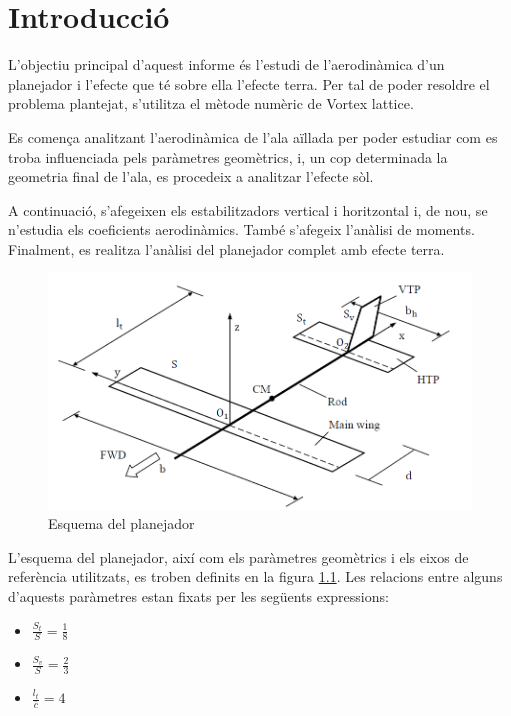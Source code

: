 \chapter{Introducció}

L'objectiu principal d'aquest informe és l'estudi de l'aerodinàmica d'un planejador i l'efecte que té sobre ella l'efecte terra. Per tal de poder resoldre el problema plantejat, s'utilitza el mètode numèric de Vortex lattice.

Es comença analitzant l'aerodinàmica de l'ala aïllada per poder estudiar com es troba influenciada pels paràmetres geomètrics, i, un cop determinada la geometria final de l'ala, es procedeix a analitzar l'efecte sòl.

A continuació, s'afegeixen els estabilitzadors vertical i horitzontal i, de nou, se n'estudia els coeficients aerodinàmics. També s'afegeix l'anàlisi de moments. Finalment, es realitza l'anàlisi del planejador complet amb efecte terra.

\begin{figure}[h]
	\centering
	\includegraphics[scale=0.5]{plots/enunciat.png}
	\caption{Esquema del planejador}
	\label{enunciat}
\end{figure}

L'esquema del planejador, així com els paràmetres geomètrics i els eixos de referència utilitzats, es troben definits en la figura \ref{enunciat}. Les relacions entre alguns d'aquests paràmetres estan fixats per les següents expressions:
\begin{itemize}
	\item $\frac{S_{t}}{S}=\frac{1}{8}$
	\item $\frac{S_{v}}{S}=\frac{2}{3}$
	\item $\frac{l_{t}}{\bar{c}}=4$
\end{itemize}

